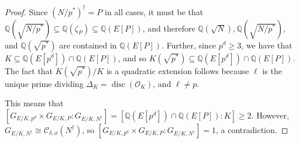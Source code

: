 \documentclass[11pt]{amsart}
\theoremstyle{definition}
\newcommand{\Q}{\mathbb{Q}}
\DeclareMathOperator{\disc}{disc} %
\begin{document}
\begin{proof}
    Since $(N/p^{\ast})^{\dagger} = P$ in all cases, it must be that $\Q(\sqrt{N/p^{\ast}}) \subseteq \Q(\zeta_{P}) \subseteq \Q(E[P])$, and therefore $\Q(\sqrt{N}), \Q(\sqrt{N/p^{\ast}}),$ and $\Q(\sqrt{p^{\ast}})$ are contained in $\Q(E[P])$. Further, since $p^d \geq 3$, we have that $K \subseteq \Q(E[p^d]) \cap \Q(E[P])$, and so $K(\sqrt{p^{\ast}}) \subseteq \Q(E[p^d]) \cap \Q(E[P])$. The fact that $K(\sqrt{p^{\ast}})/K$ is a quadratic extension follows because $\ell$ is the unique prime dividing $\Delta_K = \disc (\mathcal{O}_K)$, and $\ell \neq p$.

    This means that $[G_{E/K, p^d} \times G_{E/K, P} : G_{E/K, N^{\dagger}}] = [\Q(E[p^d]) \cap \Q(E[P]) : K] \geq 2$. However, $G_{E/K, N^{\dagger}} \cong \mathcal{C}_{\delta, \phi}(N^{\dagger})$, so $[G_{E/K, p^d} \times G_{E/K, P} : G_{E/K, N^{\dagger}}] = 1$, a contradiction.    
\end{proof}

    
    

    

\end{document}

